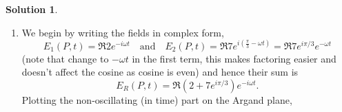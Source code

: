 \documentclass[10pt]{article}
\theoremstyle{definition}
\newtheorem{soln}{Solution}
\begin{document}
\begin{soln}~
  \begin{enumerate}[label=(\alph*)]
    \item We begin by writing the fields in complex form,
          $$E_1(P,t)=\Re{2e^{-i\omega t}}\quad\text{and}\quad E_2(P,t)=\Re{7e^{i(\frac{\pi}{3}-\omega t)}}=\Re{7e^{i\pi/3}e^{-\omega t}}$$
          (note that change to $-\omega t$ in the first term, this makes factoring easier and doesn't affect the cosine as cosine is even)
          and hence their sum is
          $$E_R(P,t)=\Re{\left(2+7e^{i\pi/3}\right)e^{-i\omega t}}.$$
          Plotting the non-oscillating (in time) part on the Argand plane,
          \begin{center}
\end{center}
\end{enumerate}
\end{soln}
\end{document}
